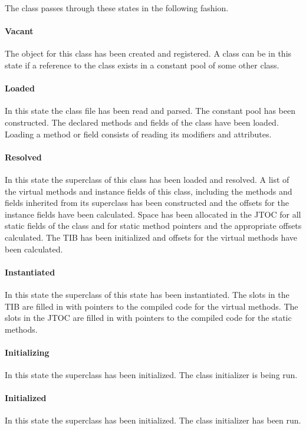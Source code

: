 The class passes through these states in the following fashion.

\paragraph{Vacant}
The 
object for this class has been created and registered. 
A class can be in this state if a reference to the class exists in a constant
pool of some other class.

\paragraph{Loaded} 
In this state the class file has been read and parsed.  The constant pool has 
been constructed. The declared methods and fields of the class have been loaded.
Loading a method or field consists of reading its modifiers and attributes.

\paragraph{Resolved}
In this state the superclass of this class has been loaded and resolved. 
A list of the virtual methods and instance fields of this class, including the 
methods and fields
inherited from its superclass has been constructed and the offsets for the 
instance fields have been calculated.  
Space has been allocated in the JTOC for all static fields of the class and for
static method pointers and the appropriate offsets calculated.
The TIB has been initialized and offsets for the virtual methods have been
calculated.

\paragraph{Instantiated}
In this state the superclass of this state has been instantiated. 
The slots in the TIB are filled in with pointers to the compiled code for the 
virtual methods. 
The slots in the JTOC are filled in with pointers to the compiled code for the 
static methods.

\paragraph{Initializing} 
In this state the superclass has been initialized. The class
initializer is being run. 

\paragraph{Initialized} 
In this state the superclass has been initialized. The class initializer has 
been run. 

